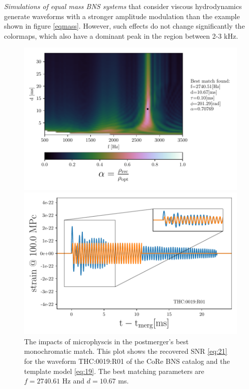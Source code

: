 \FloatBarrier


\textit{Simulations of equal mass BNS systems} that consider viscous hydrodynamics generate waveforms with a stronger amplitude modulation than the example shown in figure \ref{eqmass}. However, such effects do not change significantly the colormaps, which also have a dominant peak in the region between 2-3 kHz.


\begin{figure}[!htbp]
\begin{center}
\begin{minipage}[t]{0.5\linewidth}
\vspace{0pt}
\includegraphics[scale=0.6,trim={2mm 0 35mm 0},clip]{images/Data_analysis/results/2D_grid_11.pdf}
\end{minipage}%
\begin{minipage}[t]{0.5\linewidth}
\vspace{20pt}
\includegraphics[scale=0.45]{images/Data_analysis/results/2D_grid_12.pdf}
\end{minipage}
\captionsetup{width=0.8\textwidth}
\caption[The impacts of microphyscis in the postmerger's best monochromatic match]{The impacts of microphyscis in the postmerger's best monochromatic match. This plot shows the recovered SNR \ref{eq:21} for the waveform THC:0019:R01 of the CoRe BNS catalog \cite{Dietrich:2018phi} and the template model \ref{eq:19}. The best matching parameters are $f=2740.61$ Hz and $d=10.67$ ms.}
\end{center}
\end{figure}

